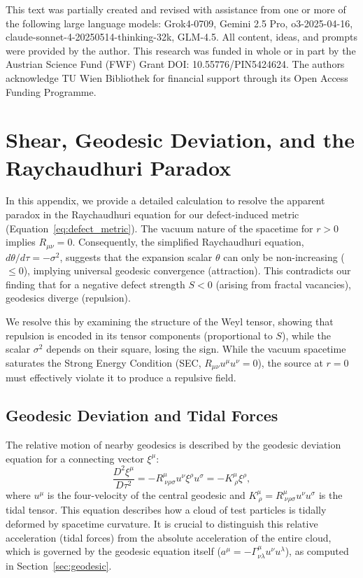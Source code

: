 \documentclass[%
  reprint,
  superscriptaddress,
  showpacs,
  showkeys,
  amsmath,amssymb,
  pra,
  longbibliography,
  floatfix,
]{revtex4-2}
\begin{document}
\begin{acknowledgments}
This text was partially created and revised with assistance from one or more of the following large language models: Grok4-0709, Gemini 2.5 Pro, o3-2025-04-16, claude-sonnet-4-20250514-thinking-32k, GLM-4.5. All content, ideas, and prompts were provided by the author.
This research was funded in whole or in part by the  Austrian Science Fund (FWF) Grant DOI: 10.55776/PIN5424624.
The authors acknowledge TU Wien Bibliothek for financial support through its Open Access Funding Programme.
\end{acknowledgments}



\appendix

\section{Shear, Geodesic Deviation, and the Raychaudhuri Paradox}
\label{app:shear}

In this appendix, we provide a detailed calculation to resolve the apparent paradox in the Raychaudhuri equation for our defect-induced metric (Equation~\ref{eq:defect_metric}). The vacuum nature of the spacetime for $r > 0$ implies $R_{\mu\nu} = 0$. Consequently, the simplified Raychaudhuri equation, $d\theta/d\tau = -\sigma^2$, suggests that the expansion scalar $\theta$ can only be non-increasing ($\leq 0$), implying universal geodesic convergence (attraction). This contradicts our finding that for a negative defect strength $S<0$ (arising from fractal vacancies), geodesics diverge (repulsion).

We resolve this by examining the structure of the Weyl tensor, showing that repulsion is encoded in its tensor components (proportional to $S$), while the scalar $\sigma^2$ depends on their square, losing the sign. While the vacuum spacetime saturates the Strong Energy Condition (SEC, $R_{\mu\nu} u^\mu u^\nu = 0$), the source at $r=0$ must effectively violate it to produce a repulsive field.

\subsection{Geodesic Deviation and Tidal Forces}
The relative motion of nearby geodesics is described by the geodesic deviation equation for a connecting vector $\xi^\mu$:
\begin{equation}
\frac{D^2 \xi^\mu}{D\tau^2} = - R^\mu_{\ \nu\rho\sigma} u^\nu \xi^\rho u^\sigma = -K^\mu_{\ \rho} \xi^\rho,
\label{eq:geodev}
\end{equation}
where $u^\mu$ is the four-velocity of the central geodesic and $K^\mu_{\ \rho} = R^\mu_{\ \nu\rho\sigma} u^\nu u^\sigma$ is the tidal tensor. This equation describes how a cloud of test particles is tidally deformed by spacetime curvature. It is crucial to distinguish this relative acceleration (tidal forces) from the absolute acceleration of the entire cloud, which is governed by the geodesic equation itself ($a^\mu = -\Gamma^\mu_{\nu\lambda} u^\nu u^\lambda$), as computed in Section~\ref{sec:geodesic}.
\end{document}
